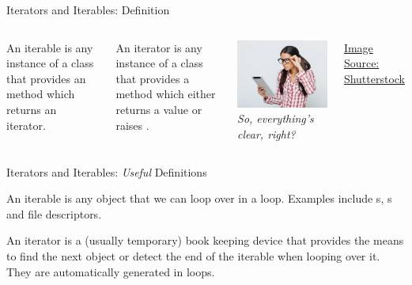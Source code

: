 \begin{frame}[fragile]{Iterators and Iterables: Definition}
%
\begin{columns}
\begin{defbox}[Iterable]
An iterable is any instance of a class that provides an  method which returns an iterator.
\end{defbox}
%
\begin{defbox}[Iterator]
An iterator is any instance of a class that provides a  method which either returns a value or raises .
\end{defbox}
%
\includegraphics[width=\linewidth]{./gfx/08-geek}
\emph{So, everything's clear, right?}

\vspace{6pt}
\begin{flushright}
\tiny
\href{https://www.shutterstock.com/image-photo/beautiful-geek-woman-holding-digital-tablet-421481161}{Image Source: Shutterstock}
\end{flushright}
\end{columns}
%
\end{frame}


\begin{frame}[fragile]{Iterators and Iterables: \emph{Useful} Definitions}
%
\begin{defbox}[Iterable]
An iterable is any object that we can loop over in a  loop. Examples include s, s and file descriptors.
\end{defbox}
%
\begin{defbox}[Iterator]
An iterator is a (usually temporary) book keeping device that provides the means to find the next object or detect the end of the iterable when looping over it.
They are automatically generated in  loops.
\end{defbox}
%
\end{frame}

